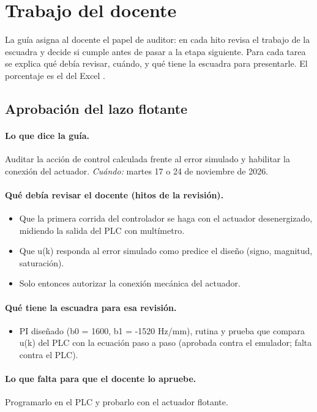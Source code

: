 \documentclass[a4paper,11pt]{article}
\begin{document}
\section{Trabajo del docente}
La guía asigna al docente el papel de auditor: en cada hito revisa el trabajo de la escuadra y decide si cumple antes de pasar a la etapa siguiente. Para cada tarea se explica qué debía revisar, cuándo, y qué tiene la escuadra para presentarle. El porcentaje es el del Excel .
\subsection{Aprobación del lazo flotante}
\paragraph{Lo que dice la guía.} Auditar la acción de control calculada frente al error simulado y habilitar la conexión del actuador. \textit{Cuándo:} martes 17 o 24 de noviembre de 2026.
\paragraph{Qué debía revisar el docente (hitos de la revisión).}
\begin{itemize}
\item[$\square$] Que la primera corrida del controlador se haga con el actuador desenergizado, midiendo la salida del PLC con multímetro.
\item[$\square$] Que u(k) responda al error simulado como predice el diseño (signo, magnitud, saturación).
\item[$\square$] Solo entonces autorizar la conexión mecánica del actuador.
\end{itemize}
\paragraph{Qué tiene la escuadra para esa revisión.}
\begin{itemize}
\item PI diseñado (b0 = 1600, b1 = -1520 Hz/mm), rutina  y prueba  que compara u(k) del PLC con la ecuación paso a paso (aprobada contra el emulador; falta contra el PLC).
\end{itemize}
\paragraph{Lo que falta para que el docente lo apruebe.} Programarlo en el PLC y probarlo con el actuador flotante.
\end{document}
